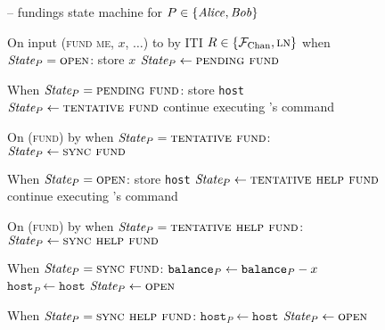 \begin{figure}[H]
  \begin{systembox}{\fchan{} -- fundings state machine for $P \in \{\mathit{Alice},
  \mathit{Bob}\}$}
    \begin{algorithmic}[1]
      \State On input (\textsc{fund me}, $x$, $\dots$) to \bob by ITI
      $R \in \{\mathcal{F}_{\mathrm{Chan}}, \textsc{ln}\}$ when $\itistate_P = \textsc{open}$:
      \label{code:functionality:state-machine:when-fund}
      \Indent
        \State store $x$
        \State $\itistate_P \gets \textsc{pending fund}$
      \EndIndent
      \Statex

      \State When $\itistate_P = \textsc{pending fund}$:
      \Indent
          \State store \texttt{host}
          \State $\itistate_P \gets \textsc{tentative fund}$
          \State continue executing \adversary's command
        \EndIf
      \EndIndent
      \Statex

      \State On (\textsc{fund}) by \adversary when $\itistate_P =
      \textsc{tentative fund}$:
      \Indent
        \State $\itistate_P \gets \textsc{sync fund}$
      \EndIndent
      \Statex

      \State When $\itistate_P = \textsc{open}$:
      \Indent
          \State store \texttt{host}
          \State $\itistate_P \gets \textsc{tentative help fund}$
          \State continue executing \adversary's command
        \EndIf
      \EndIndent
      \Statex

      \State On (\textsc{fund}) by \adversary when $\itistate_P =
      \textsc{tentative help fund}$:
      \Indent
        \State $\itistate_P \gets \textsc{sync help fund}$
      \EndIndent
      \Statex

      \State When $\itistate_P = \textsc{sync fund}$:
      \Indent
          \State $\texttt{balance}_{P} \gets \texttt{balance}_{P} - x$
          \State $\texttt{host}_P \gets \texttt{host}$
          \State {}
          \State $\itistate_P \gets \textsc{open}$
          \label{code:functionality:fund:fund-end}
        \EndIf
      \EndIndent
      \Statex

      \State When $\itistate_P = \textsc{sync help fund}$:
      \Indent
          \State $\texttt{host}_P \gets \texttt{host}$
          \State {}
          \State $\itistate_P \gets \textsc{open}$
          \label{code:functionality:fund:help-fund-end}
        \EndIf
      \EndIndent
    \end{algorithmic}
  \end{systembox}
  \caption{}
  \label{code:functionality:fund}
\end{figure}
